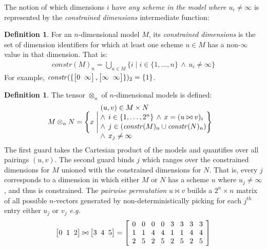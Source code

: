 \documentclass[10pt,preprint]{sigplanconf}
\newcounter{block}
\theoremstyle{definition}
\newtheorem{definition}[block]{Definition}
\newcommand{\eg}{\emph{e.g.}}
\newcommand{\vtwoh}[2]{\setlength{\arraycolsep}{0em}
\left[\begin{array}{cc}#1 \; & \; #2\end{array}\right]}
\newcommand{\vthreeh}[3]{\setlength{\arraycolsep}{0em}
\left[\begin{array}{ccc}#1 \; & \; #2 \; & \; #3\end{array}\right]}
\newcommand{\effdims}[2]{\mathit{constr}(#1)_{#2}}
\begin{document}
The notion of which dimensions $i$ have \emph{any scheme in the model
where $u_i \neq \infty$} is represented by the \emph{constrained
dimensions} intermediate function:
\begin{definition}%
For an $n$-dimensional model $M$, its \emph{constrained dimensions}
is the set of dimension identifiers for which at least one scheme $u \in M$ has
a non-$\infty$ value in that dimension. That is:
%
\begin{align*}
\effdims{M}{n} =
\bigcup_{u \in M} \{i \mid i \in \{1,\ldots,n\} \, \wedge \, u_i \neq
  \infty\}
\end{align*}
For example, $\effdims{\{\vtwoh{0}{\infty},\vtwoh{\infty}{\infty}\}}{2}
 = \{1\}$.
\end{definition}
\begin{definition}The tensor $\otimes_n$ of $n$-dimensional
models is defined:
\begin{alignat*}{2}
& M \otimes_n N =
  \Bigg\{x \; \Bigg| \;
    \parbox{5.2cm}{$(u, v) \in M \times N $ \\[0.1em]
                  $\;\; \wedge \;\, i \in \{1, \ldots, 2^n\} \, \wedge
                  \, x = (u \bowtie v)_i$ \\[0.1em]
                  $\;\; \wedge \;\, j \in (\effdims{M}{n} \cup
                   \effdims{N}{n})$\\[0.1em]
                   $\;\; \wedge \;\, x_j \neq \infty$
                  } \Bigg\}
\end{alignat*}
The first guard takes the Cartesian product of
the models and quantifies over all pairings $(u, v)$.
The second guard binds $j$ which ranges over the constrained
dimensions for $M$ unioned with the constrained dimensions for $N$.
That is, every $j$ corresponds to a dimension in which
either $M$ or $N$ has a scheme $u$ where $u_j \neq \infty$,
and thus is constrained.
The \emph{pairwise permutation} $u \bowtie v$
builds a $2^n \times n$ matrix
of all possible $n$-vectors generated by
non-deterministically picking for each $j^{th}$ entry either
$u_j$ or $v_j$ \eg{}
%
\begin{equation*}
\vthreeh{0}{1}{2} \bowtie \vthreeh{3}{4}{5} =
\left[
\setlength{\arraycolsep}{0.42em}
\begin{array}{cccccccc}
0 & 0 & 0 & 0 & 3 & 3 & 3 & 3 \\
1 & 1 & 4 & 4 & 1 & 1 & 4 & 4 \\
2 & 5 & 2 & 5 & 2 & 5 & 2 & 5
\end{array}
\right]
\end{equation*}

\end{definition}
\end{document}
